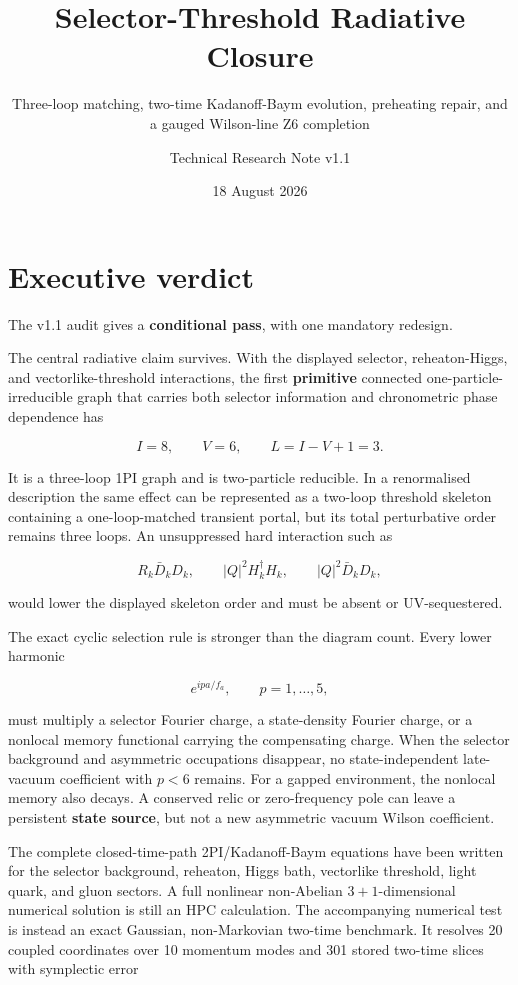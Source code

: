 \documentclass[
  10pt,
]{article}
\title{Selector-Threshold Radiative Closure}
\subtitle{Three-loop matching, two-time Kadanoff-Baym evolution,
preheating repair, and a gauged Wilson-line Z6 completion}
\author{Technical Research Note v1.1}
\date{18 August 2026}
\begin{document}
\maketitle

{
\hypersetup{linkcolor=}
\setcounter{tocdepth}{3}
\tableofcontents
}
\section{Executive verdict}\label{executive-verdict}

The v1.1 audit gives a \textbf{conditional pass}, with one mandatory
redesign.

The central radiative claim survives. With the displayed selector,
reheaton-Higgs, and vectorlike-threshold interactions, the first
\textbf{primitive} connected one-particle-irreducible graph that carries
both selector information and chronometric phase dependence has

\[
I=8,\qquad V=6,\qquad L=I-V+1=3.
\]

It is a three-loop 1PI graph and is two-particle reducible. In a
renormalised description the same effect can be represented as a
two-loop threshold skeleton containing a one-loop-matched transient
portal, but its total perturbative order remains three loops. An
unsuppressed hard interaction such as

\[
R_k\bar D_kD_k,
\qquad
|Q|^2H_k^\dagger H_k,
\qquad
|Q|^2\bar D_kD_k,
\]

would lower the displayed skeleton order and must be absent or
UV-sequestered.

The exact cyclic selection rule is stronger than the diagram count.
Every lower harmonic

\[
e^{ip a/f_a},\qquad p=1,\ldots,5,
\]

must multiply a selector Fourier charge, a state-density Fourier charge,
or a nonlocal memory functional carrying the compensating charge. When
the selector background and asymmetric occupations disappear, no
state-independent late-vacuum coefficient with \(p<6\) remains. For a
gapped environment, the nonlocal memory also decays. A conserved relic
or zero-frequency pole can leave a persistent \textbf{state source}, but
not a new asymmetric vacuum Wilson coefficient.

The complete closed-time-path 2PI/Kadanoff-Baym equations have been
written for the selector background, reheaton, Higgs bath, vectorlike
threshold, light quark, and gluon sectors. A full nonlinear non-Abelian
\(3+1\)-dimensional numerical solution is still an HPC calculation. The
accompanying numerical test is instead an exact Gaussian, non-Markovian
two-time benchmark. It resolves 20 coupled coordinates over 10 momentum
modes and 301 stored two-time slices with symplectic error
\end{document}
